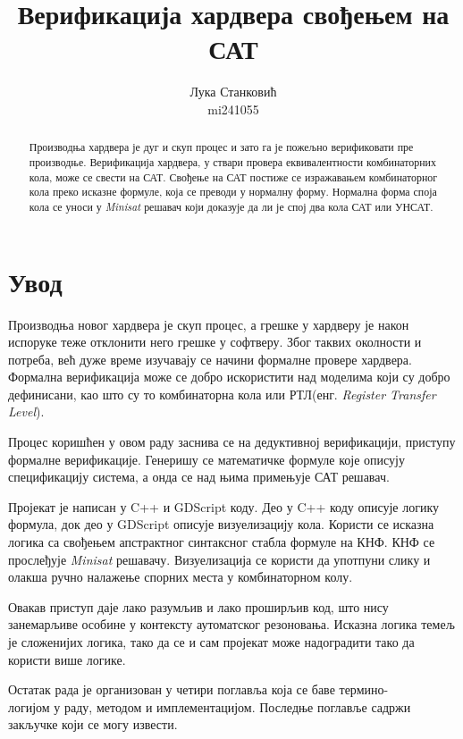 \documentclass[a4paper,10pt]{article}
\title{Верификација хардвера свођењем на САТ}
\author{Лука Станковић\\mi241055}
\begin{document}
\maketitle

\begin{abstract}
Производња хардвера је дуг и скуп процес и зато га је пожељно верификовати пре производње. Верификација хардвера, у ствари провера еквивалентности комбинаторних кола, може се свести на САТ. Свођење на САТ постиже се изражавањем комбинаторног кола преко исказне формуле, која се преводи у нормалну форму. Нормална форма споја кола се уноси у \textit{Minisat} решавач који доказује да ли је спој два кола САТ или УНСАТ.
\end{abstract}

\section{Увод}

Производња новог хардвера је скуп процес, а грешке у хардверу је након испоруке теже отклонити него грешке у софтверу\cite{verifikacija_softvera}. Због таквих околности и потреба, већ дуже време изучавају се начини формалне провере хардвера. Формална верификација може се добро искористити над моделима који су добро дефинисани, као што су то комбинаторна кола или РТЛ(енг. \textit{Register Transfer Level}).

Процес коришћен у овом раду заснива се на дедуктивној верификацији, приступу формалне верификације. Генеришу се математичке формуле које описују спецификацију система, а онда се над њима примењује САТ решавач.

Пројекат је написан у C++ и GDScript коду. Део у C++ коду описује логику формула, док део у GDScript описује визуелизацију кола. Користи се исказна логика са свођењем апстрактног синтаксног стабла формуле на КНФ. КНФ се прослеђује \textit{Minisat} решавачу. Визуелизација се користи да употпуни слику и олакша ручно налажење спорних места у комбинаторном колу.

Овакав приступ даје лако разумљив и лако проширљив код, што нису занемарљиве особине у контексту аутоматског резоновања. Исказна логика темељ је сложенијих логика, тако да се и сам пројекат може надоградити тако да користи више логике.

Остатак рада је организован у четири поглавља која се баве термино-\\логијом у раду, методом и имплементацијом. Последње поглавље садржи закључке који се могу извести.
\end{document}
